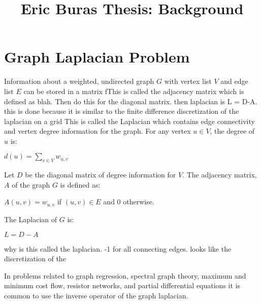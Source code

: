 \documentclass{article}
\begin{document}
\title{Eric Buras Thesis: Background}

\maketitle

\section{Graph Laplacian Problem}
Information about a weighted, undirected graph $G$ with vertex list $V$ and edge list $E$ can be stored in a matrix fThis is called the adjacency matrix which is defined as blah. Then do this for the diagonal matrix. then laplacian is L = D-A. this is done because it is similar to the finite difference discretization of the laplacian on a grid This is called the Laplacian which contains edge connectivity and vertex degree information for the graph. For any vertex $u \in V$, the degree of $u$ is:\\
\begin{center} $d(u) = \sum_{v \in V} w_{u,v}$ \cite{Spielman:2010} \\
\end{center}
Let $D$ be the diagonal matrix of degree information for $V$. The adjacency matrix, $A$ of the graph $G$ is defined as:\\
\begin{center} $A(u,v) = w_{u,v}$ if $(u,v) \in E$ and $0$ otherwise. \cite{Spielman:2010} \\
\end{center}
The Laplacian of $G$ is:\\
\begin{center} $L = D-A$ \cite{Spielman:2010} \\
\end{center}

why is this called the laplacian. -1 for all connecting edges. looks like the discretization of the 

In problems related to graph regression, spectral graph theory, maximum and minimum cost flow, resistor networks, and partial differential equations it is common to use the inverse operator of the graph laplacian. \cite{Spielman:2010}
\end{document}
